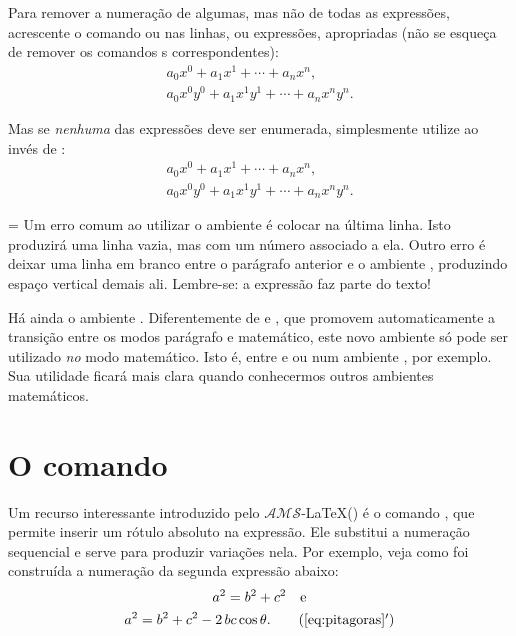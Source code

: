 \documentclass[a4paper,12pt]{amsart}
\newcommand{\amslatex}{$\mathcal {AMS}$-\LaTeX\xspace}
\newlength\atencaowidth
\newenvironment{atencao}{%
		\medskip%
		\noindent\hangindent=\atencaowidth\hangafter=-2%
		\hspace{-\atencaowidth}%
		\usebox{\atencaobox}\footnotesize
		\setlength\parindent\atencaowidth}{\par\medskip}
\begin{document}
	Para remover a numeração de algumas, mas não de todas as expressões, acrescente o comando  ou  nas linhas, ou expressões, apropriadas (não se esqueça de remover os comandos s correspondentes):
	\begin{gather}
		a_0 x^0 + a_1 x^1 + \cdots + a_n x^n \text{,} \nonumber\\
		a_0 x^0 y^0 + a_1 x^1 y^1 + \cdots + a_n x^n y^n \text{.}
	\end{gather}
	
	Mas se \emph{nenhuma} das expressões deve ser enumerada, simplesmente utilize  ao invés de :
	\begin{gather*}
		a_0 x^0 + a_1 x^1 + \cdots + a_n x^n \text{,} \\
		a_0 x^0 y^0 + a_1 x^1 y^1 + \cdots + a_n x^n y^n \text{.}
	\end{gather*}
		
	\begin{atencao}%
	Um erro comum ao utilizar o ambiente  é colocar \cs{\textbackslash} na última linha. Isto produzirá uma linha vazia, mas com um número associado a ela. Outro erro é deixar uma linha em branco entre o parágrafo anterior e o ambiente , produzindo espaço vertical demais ali. Lembre-se: a expressão faz parte do texto!
	\end{atencao}

	Há ainda o ambiente . Diferentemente de  e , que promovem automaticamente a transição entre os modos parágrafo e matemático, este novo ambiente só pode ser utilizado \emph{no} modo matemático. Isto é, entre \cs{[} e \cs{]} ou num ambiente , por exemplo. Sua utilidade ficará mais clara quando conhecermos outros ambientes matemáticos.

	\section{O comando }

	Um recurso interessante introduzido pelo \amslatex () é o comando , que permite inserir um rótulo absoluto na expressão. Ele substitui a numeração sequencial e serve para produzir variações nela. Por exemplo, veja como foi construída a numeração da segunda expressão abaixo:
	\begin{gather}	
	a^2 = b^2 + c^2 \text{\quad e}\label{eq:pitagoras}\\
	a^2 = b^2 + c^2 - 2\, b c \cos\theta\text{.} \tag{\ref{eq:pitagoras}$'$}\label{eq:lei-cosseno}
	\end{gather}
\end{document}
